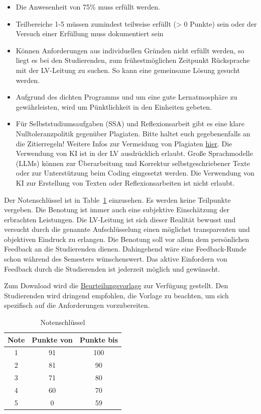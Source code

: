 \documentclass[
  letterpaper,
  DIV=11,
  numbers=noendperiod]{scrreprt}
\providecommand{\tightlist}{%
  \setlength{\itemsep}{0pt}\setlength{\parskip}{0pt}}
\begin{document}
\begin{itemize}
\tightlist
\item
  Die Anwesenheit von 75\% muss erfüllt werden.
\item
  Teilbereiche 1-5 müssen zumindest teilweise erfüllt (\textgreater{} 0
  Punkte) sein oder der Versuch einer Erfüllung muss dokumentiert sein
\item
  Können Anforderungen aus individuellen Gründen nicht erfüllt werden,
  so liegt es bei den Studierenden, zum frühestmöglichen Zeitpunkt
  Rücksprache mit der LV-Leitung zu suchen. So kann eine gemeinsame
  Lösung gesucht werden.
\item
  Aufgrund des dichten Programms und um eine gute Lernatmosphäre zu
  gewährleisten, wird um Pünktlichkeit in den Einheiten gebeten.
\item
  Für Selbststudiumsaufgaben (SSA) und Reflexionsarbeit gibt es eine
  klare Nulltoleranzpolitik gegenüber Plagiaten. Bitte haltet euch
  gegebenenfalls an die Zitierregeln! Weitere Infos zur Vermeidung von
  Plagiaten \hyperref[0]{hier}. Die Verwendung von KI ist in der LV
  ausdrücklich erlaubt. Große Sprachmodelle (LLMs) können zur
  Überarbeitung und Korrektur selbstgeschriebener Texte oder zur
  Unterstützung beim Coding eingesetzt werden. Die Verwendung von KI zur
  Erstellung von Texten oder Reflexionsarbeiten ist nicht erlaubt.
\end{itemize}

Der Notenschlüssel ist in Table~\ref{tbl-Noten} einzusehen. Es werden
keine Teilpunkte vergeben. Die Benotung ist immer auch eine subjektive
Einschätzung der erbrachten Leistungen. Die LV-Leitung ist sich dieser
Realität bewusst und versucht durch die genannte Aufschlüsselung einen
möglichst transparenten und objektiven Eindruck zu erlangen. Die
Benotung soll vor allem dem persönlichen Feedback an die Studierenden
dienen. Dahingehend wäre eine Feedback-Runde schon während des Semesters
wünschenswert. Das aktive Einfordern von Feedback durch die Studierenden
ist jederzeit möglich und gewünscht.

Zum Download wird die
\href{Intro_files/Beurteilungsvorlage.xlsx}{Beurteilungsvorlage} zur
Verfügung gestellt. Den Studierenden wird dringend empfohlen, die
Vorlage zu beachten, um sich spezifisch auf die Anforderungen
vorzubereiten.

\begingroup\fontsize{12}{14}\selectfont

\begin{longtable}[t]{ccc}

\caption{\label{tbl-Noten}Notenschlüssel}

\tabularnewline

\toprule
Note & Punkte von & Punkte bis\\
\midrule
1 & 91 & 100\\
2 & 81 & 90\\
3 & 71 & 80\\
4 & 60 & 70\\
5 & 0 & 59\\
\bottomrule

\end{longtable}
\end{document}
